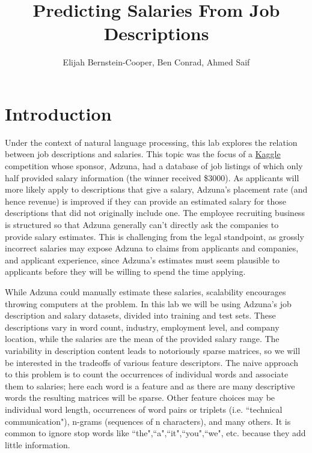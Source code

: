 \documentclass[12pt]{article}
\begin{document}
\title{Predicting Salaries From Job Descriptions}

\author{
Elijah Bernstein-Cooper, Ben Conrad, Ahmed Saif
}
\maketitle



\section{Introduction}

    Under the context of natural language processing, this lab explores the
    relation between job descriptions and salaries.  This topic was the focus
    of a \href{http://www.kaggle.com/c/job-salary-prediction}{Kaggle}
    competition whose sponsor, Adzuna, had a database of job listings of which
    only half provided salary information (the winner received \$3000).  As
    applicants will more likely apply to descriptions that give a salary,
    Adzuna's placement rate (and hence revenue) is improved if they can provide
    an estimated salary for those descriptions that did not originally include
    one. The employee recruiting business is structured so that Adzuna
    generally can't directly ask the companies to provide salary estimates.
    This is challenging from the legal standpoint, as grossly incorrect
    salaries may expose Adzuna to claims from applicants and companies, and
    applicant experience, since Adzuna's estimates must seem plausible to
    applicants before they will be willing to spend the time applying.

    While Adzuna could manually estimate these salaries, scalability encourages
    throwing computers at the problem.  In this lab we will be using Adzuna's
    job description and salary datasets, divided into training and test sets.
    These descriptions vary in word count, industry, employment level, and
    company location, while the salaries are the mean of the provided salary
    range.  The variability in description content leads to notoriously sparse
    matrices, so we will be interested in the tradeoffs of various feature
    descriptors.  The naive approach to this problem is to count the
    occurrences of individual words and associate them to salaries; here each
    word is a feature and as there are many descriptive words the resulting
    matrices will be sparse.  Other feature choices may be individual word
    length, occurrences of word pairs or triplets (i.e. ``technical
    communication"), n-grams (sequences of n characters), and many others. It
    is common to ignore stop words like ``the",``a",``it",``you",``we", etc.
    because they add little information.
\end{document}
